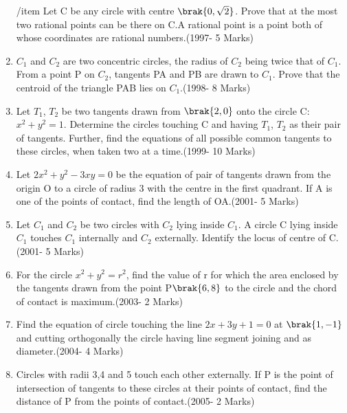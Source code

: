 \documentclass[journal,12pt,twocolumn]{IEEEtran}
\theoremstyle{remark}
\begin{document}
\begin{enumerate}
/item Let C be any circle with centre $\brak{0,\sqrt{2}}$. Prove that at the most two rational points can be there on C.A rational point is a point both of whose coordinates are rational numbers.\hfill(1997- 5 Marks)\\




\item $C_{1}$ and $C_{2}$ are two concentric circles, the radius of $C_{2}$ being twice that of $C_{1}$. From a point P on $C_{2}$, tangents PA and PB are drawn to $C_{1}$. Prove that the centroid of the triangle PAB lies on $C_{1}$.\hfill(1998- 8 Marks)\\




\item Let $T_{1}$, $T_{2}$ be two tangents drawn from $\brak{2,0}$ onto the circle C:$x^2+y^2=1$. Determine the circles touching C and having $T_{1}$, $T_{2}$ as their pair of tangents. Further, find the equations of all possible common tangents to these circles, when taken two at a time.\hfill(1999- 10 Marks)\\




\item Let $2x^2+y^2-3xy=0$ be the equation of pair of tangents drawn from the origin O to a circle of radius 3 with the centre in the first quadrant. If A is one of the points of contact, find the length of OA.\hfill(2001- 5 Marks)\\




\item Let $C_{1}$ and $C_{2}$ be two circles with $C_{2}$ lying inside $C_{1}$. A circle C lying inside $C_{1}$ touches $C_{1}$ internally and $C_{2}$ externally. Identify the locus of centre of C.\hfill(2001- 5 Marks)\\





\item For the circle $x^2+y^2=r^2$, find the value of r for which the area enclosed by the tangents drawn from the point P$\brak{6,8}$ to the circle and the chord of contact is maximum.\hfill(2003- 2 Marks)\\ 





\item Find the equation of circle touching the line $2x+3y+1=0$ at $\brak{1,-1}$ and cutting orthogonally the circle having line segment joining  and  as diameter.\hfill(2004- 4 Marks)\\     




\item Circles with radii 3,4 and 5 touch each other externally. If P is the point of intersection of tangents to these circles at their points of contact, find the distance of P from the points of contact.\hfill(2005- 2 Marks)\\ 
\end{enumerate}
\newpage
\end{document}

